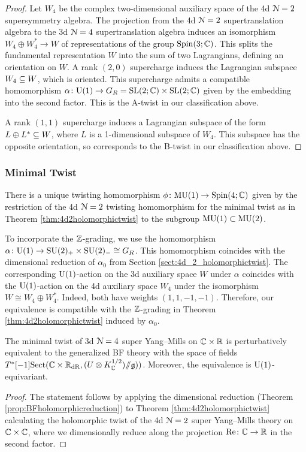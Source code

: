 \documentclass[10pt, oneside]{article}
\begin{document}
\begin{proof}
Let $W_4$ be the complex two-dimensional auxiliary space of the 4d $\mathcal N=2$ supersymmetry algebra.
The projection from the 4d $\mathcal{N}=2$ supertranslation algebra to the 3d $\mathcal{N}=4$ supertranslation algebra induces an isomorphism $W_4 \oplus W_4^* \to W$ of representations of the group $\mathrm{Spin}(3;\mathbb C)$.  
This splits the fundamental representation $W$ into the sum of two Lagrangians, defining an orientation on $W$. 
A rank $(2,0)$ supercharge induces the Lagrangian subspace $W_4 \subseteq W$, which is oriented.  This supercharge admits a compatible homomorphism $\alpha \colon \mathrm{U}(1) \to G_R = \mathrm{SL}(2;\mathbb C) \times \mathrm{SL}(2;\mathbb C)$ given by the embedding into the second factor. This is the A-twist in our classification above.

A rank $(1,1)$ supercharge induces a Lagrangian subspace of the form $L \oplus L^* \subseteq W$, where $L$ is a 1-dimensional subspace of $W_4$.  This subspace has the opposite orientation, so corresponds to the B-twist in our classification above.  
\end{proof}

\subsubsection{Minimal Twist}
\label{sect:3d_4_minimal_twist}
There is a unique twisting homomorphism $\phi \colon \mathrm{MU}(1) \to \mathrm{Spin}(4;\mathbb C)$ given by the restriction of the 4d $\mathcal N=2$ twisting homomorphism for the minimal twist as in Theorem \ref{thm:4d2holomorphictwist} to the subgroup $\mathrm{MU}(1) \subset \mathrm{MU}(2)$. 

To incorporate the $\mathbb Z$-grading, we use the homomorphism $\alpha \colon \mathrm{U}(1) \to \mathrm{SU}(2)_+ \times \mathrm{SU}(2)_- \cong G_R$. This homomorphism coincides with the dimensional reduction of $\alpha_0$ from Section \ref{sect:4d_2_holomorphictwist}. The corresponding $\mathrm{U}(1)$-action on the 3d auxiliary space $W$ under $\alpha$ coincides with the $\mathrm{U}(1)$-action on the 4d auxiliary space $W_4$ under the isomorphism $W\cong W_4\oplus W_4^*$. Indeed, both have weights $(1,1,-1,-1)$.  Therefore, our equivalence is compatible with the $\mathbb Z$-grading in Theorem \ref{thm:4d2holomorphictwist} induced by $\alpha_0$.

\begin{theorem} \label{3d_4_minimal_twist_thm}
The minimal twist of 3d $\mathcal N=4$ super Yang--Mills on $\mathbb C\times \mathbb R$ is perturbatively equivalent to the generalized BF theory with the space of fields $T^*[-1]\mathrm{Sect}(\mathbb C \times \mathbb R_{\mathrm{dR}}, (U \otimes K^{1/2}_\mathbb C) /\!\!/ \mathfrak{g}))$. Moreover, the equivalence is $\mathrm{U}(1)$-equivariant.
\end{theorem}
\begin{proof}
The statement follows by applying the dimensional reduction (Theorem \ref{prop:BFholomorphicreduction}) to Theorem \ref{thm:4d2holomorphictwist} calculating the holomorphic twist of the 4d $\mathcal{N}=2$ super Yang--Mills theory on $\mathbb C\times\mathbb C$, where we dimensionally reduce along the projection $\mathrm{Re}\colon\mathbb C\rightarrow \mathbb R$ in the second factor.
\end{proof}
\end{document}
